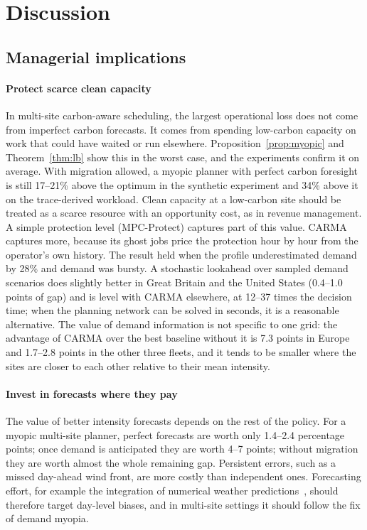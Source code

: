 \section{Discussion}\label{sec:discussion}

\subsection{Managerial implications}

\paragraph{Protect scarce clean capacity} In multi-site carbon-aware scheduling, the largest operational loss does not come from imperfect carbon forecasts. It comes from spending low-carbon capacity on work that could have waited or run elsewhere. Proposition~\ref{prop:myopic} and Theorem~\ref{thm:lb} show this in the worst case, and the experiments confirm it on average. With migration allowed, a myopic planner with perfect carbon foresight is still 17--21\% above the optimum in the synthetic experiment and 34\% above it on the trace-derived workload. Clean capacity at a low-carbon site should be treated as a scarce resource with an opportunity cost, as in revenue management. A simple protection level (MPC-Protect) captures part of this value. CARMA captures more, because its ghost jobs price the protection hour by hour from the operator's own history. The result held when the profile underestimated demand by 28\% and demand was bursty. A stochastic lookahead over sampled demand scenarios does slightly better in Great Britain and the United States (0.4--1.0 points of gap) and is level with CARMA elsewhere, at 12--37 times the decision time; when the planning network can be solved in seconds, it is a reasonable alternative. The value of demand information is not specific to one grid: the advantage of CARMA over the best baseline without it is 7.3 points in Europe and 1.7--2.8 points in the other three fleets, and it tends to be smaller where the sites are closer to each other relative to their mean intensity.

\paragraph{Invest in forecasts where they pay} The value of better intensity forecasts depends on the rest of the policy. For a myopic multi-site planner, perfect forecasts are worth only 1.4--2.4 percentage points; once demand is anticipated they are worth 4--7 points; without migration they are worth almost the whole remaining gap. Persistent errors, such as a missed day-ahead wind front, are more costly than independent ones. Forecasting effort, for example the integration of numerical weather predictions~\cite{maji2022carboncast,lowry2018day}, should therefore target day-level biases, and in multi-site settings it should follow the fix of demand myopia.

